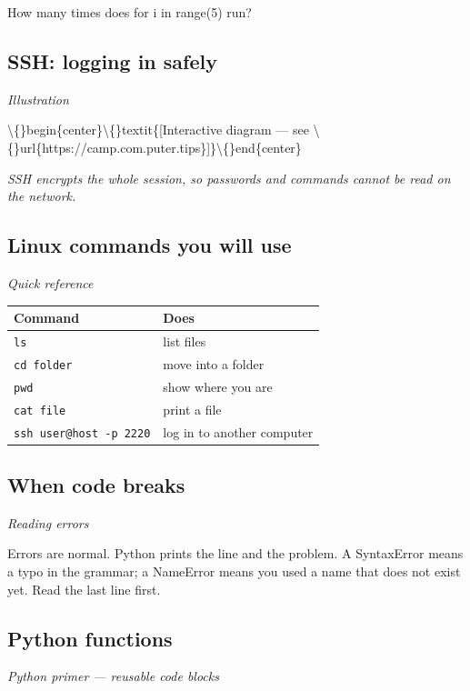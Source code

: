 \documentclass[12pt,openany]{book}
\begin{document}
How many times does for i in range(5) run?

\medskip

\subsection*{SSH: logging in safely}
{\small\itshape\color{gray}Illustration}

\textbackslash\{\}begin\{center\}\textbackslash\{\}textit\{[Interactive diagram --- see \textbackslash\{\}url\{https://camp.com.puter.tips\}]\}\textbackslash\{\}end\{center\}

{\small\itshape\color{gray}SSH encrypts the whole session, so passwords and commands cannot be read on the network.}

\medskip

\subsection*{Linux commands you will use}
{\small\itshape\color{gray}Quick reference}


\begin{center}\small\begin{tabular}{p{6.5cm}p{6.5cm}}\toprule
\textbf{Command} & \textbf{Does} \\ \midrule
\texttt{ls} & list files \\
\texttt{cd folder} & move into a folder \\
\texttt{pwd} & show where you are \\
\texttt{cat file} & print a file \\
\texttt{ssh user@host -p 2220} & log in to another computer \\
\bottomrule\end{tabular}\end{center}

\medskip

\subsection*{When code breaks}
{\small\itshape\color{gray}Reading errors}


Errors are normal. Python prints the line and the problem. A SyntaxError means a typo in the grammar; a NameError means you used a name that does not exist yet. Read the last line first.

\medskip

\subsection*{Python functions}
{\small\itshape\color{gray}Python primer --- reusable code blocks}
\end{document}
